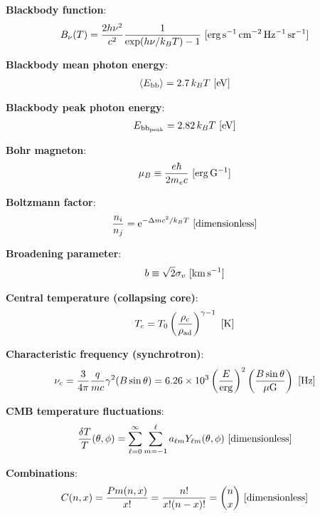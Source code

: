 \documentclass[a4paper,10pt]{article}
\begin{document}
{\noindent}\textbf{Blackbody function}:
\begin{align*}
    B_\nu(T) = \frac{2h\nu^2}{c^2} \frac{1}{\exp(h\nu/k_BT) - 1} ~ [{\rm erg\,s^{-1}\,cm^{-2}\,Hz^{-1}\,sr^{-1}}]
\end{align*}

{\noindent}\textbf{Blackbody mean photon energy}:
\begin{align*}
    \langle E_\mathrm{bb} \rangle = 2.7\,k_BT  ~ [{\rm eV}]
\end{align*}

{\noindent}\textbf{Blackbody peak photon energy}:
\begin{align*}
    E_\mathrm{bb_{peak}} = 2.82\,k_BT ~ [{\rm eV}]
\end{align*}

{\noindent}\textbf{Bohr magneton}:
\begin{align*}
    \mu_B \equiv \frac{e\hbar}{2m_ec} ~ [{\rm erg\,G^{-1}}]
\end{align*}

{\noindent}\textbf{Boltzmann factor}:
\begin{align*}
    \frac{n_i}{n_j} = \mathrm{e}^{-\Delta mc^2/k_BT} ~ [{\rm dimensionless}]
\end{align*}

{\noindent}\textbf{Broadening parameter}:
\begin{align*}
    b \equiv \sqrt{2}\sigma_v ~ [{\rm km\,s^{-1}}]
\end{align*}

{\noindent}\textbf{Central temperature (collapsing core)}:
\begin{align*}
    T_c = T_0 \left(\frac{\rho_c}{\rho_{\rm ad}}\right) ^{\gamma-1} ~ [{\rm K}]
\end{align*}

{\noindent}\textbf{Characteristic frequency (synchrotron)}:
\begin{align*}
    \nu_c = \frac{3}{4\pi}\frac{q}{mc}\gamma^2(B\sin\theta) = 6.26\times10^3 \left(\frac{E}{{\rm erg}}\right)^2 \left(\frac{B\sin\theta}{\mu{\rm G}}\right) ~ [{\rm Hz}]
\end{align*}

{\noindent}\textbf{CMB temperature fluctuations}:
\begin{align*}
    \frac{\delta T}{T}(\theta,\phi) = \sum\limits_{\ell=0}^{\infty}\sum\limits_{m=-1}^{\ell} a_{\ell m}Y_{\ell m}(\theta,\phi) ~ [{\rm dimensionless}]
\end{align*}

{\noindent}\textbf{Combinations}:
\begin{align*}
    C(n,x) = \frac{Pm(n,x)}{x!} = \frac{n!}{x!(n-x)!} = \binom{n}{x} ~ [{\rm dimensionless}]
\end{align*}
\end{document}
